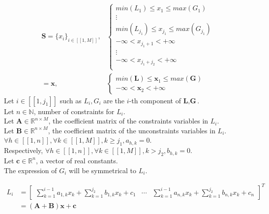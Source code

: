 \documentclass{article}
\begin{document}
\begin{equation*}
    \begin{split}
    \textbf{S}=\{x_{i}\}_{i \in [\![1,M]\!]},&
    \begin{cases}
        min(L_{1}) \leqslant x_{1} \leqslant max(G_{1})\\
        \vdots   \\
        min(L_{j_{1}}) \leqslant x_{j_{1}} \leqslant max(G_{j_{1}})\\
        -\infty < x_{j_{1}+1} < +\infty\\
        \vdots   \\
        -\infty < x_{j_{1}+j_{2}} < +\infty\\
    \end{cases}\\
    = \textbf{x} ,&
    \begin{cases}
        min(\textbf{L}) \leqslant \textbf{x}_{1} \leqslant max(\textbf{G})\\
        -\infty < \textbf{x}_{2} < +\infty
    \end{cases}
    \end{split}
\end{equation*}
Let $i \in [\![1,j_{1}]\!]$ such as $L_{i},G_{i}$ are the $i$-th component of $\textbf{L},\textbf{G}$.\\
Let $n \in \mathbb{N}$, number of constraints for $L_{i}$.\\
Let $\textbf{A} \in \mathbb{R}^{ n \times M }$, the coefficient matrix of the constraints variables in $L_{i}$.\\
Let $\textbf{B} \in \mathbb{R}^{ n \times M }$, the coefficient matrix of the unconstraints variables in $L_{i}$.\\
$\forall h \in [\![1,n]\!], \forall k \in [\![1,M]\!], k \geqslant j_{1}, a_{h,k} =0 $.\\
Respectively, $\forall h \in [\![1,n]\!], \forall k \in [\![1,M]\!], k > j_{2}, b_{h,k} =0 $.\\
Let $\textbf{c} \in \mathbb{R}^{n}$, a vector of real constants.\\
The expression of $G_{i}$ will be symmetrical to $L_{i}$.

\begin{equation*}
    \begin{split}
    L_{i}&=
    \begin{bmatrix}
        \sum_{k=1}^{i-1} a_{1,k}x_{k} + \sum_{k=1}^{j_{2}}b_{1,k}x_{k} + c_{1} 
        & \cdots 
        & \sum_{k=1}^{i-1} a_{n,k}x_{k} + \sum_{k=1}^{j_{2}}b_{n,k}x_{k} + c_{n}
    \end{bmatrix}^{T}\\
    &=
    (\textbf{A} + \textbf{B})\textbf{x} + \textbf{c}
\end{split}
\end{equation*}
\end{document}
